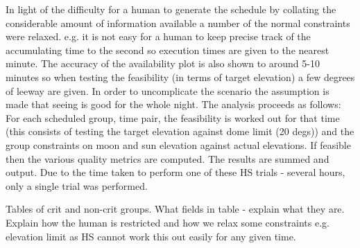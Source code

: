 In light of the difficulty for a human to generate the schedule by collating the considerable amount of information available a number of the normal constraints were relaxed. e.g. it is not easy for a human to keep precise track of the accumulating time to the second so execution times are given to the nearest minute. The accuracy of the availability plot is also shown to around 5-10 minutes so when testing the feasibility (in terms of target elevation) a few degrees of leeway are given. In order to uncomplicate the scenario the assumption is made that seeing is good for the whole night. The analysis proceeds as follows:
For each scheduled group, time pair, the feasibility is worked out for that time (this consists of testing the target elevation against dome limit (20 degs)) and the group constraints on moon and sun elevation against actual elevations. If feasible then the various quality metrics are computed. The results are summed and output. Due to the time taken to perform one of these HS trials - several hours, only a single trial was performed.

Tables of crit and non-crit groups. What fields in table - explain what they are.
Explain how the human is restricted and how we relax some constraints e.g. elevation limit as HS cannot work this out easily for any given time.

\clearpage

